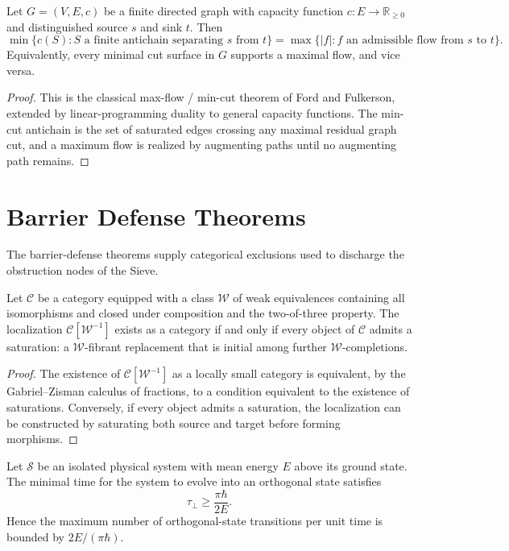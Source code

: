 \begin{theorem}\label{thm-antichain-surface}
Let $G = (V,E,c)$ be a finite directed graph with capacity function $c : E \to \mathbb R_{\ge 0}$ and distinguished source $s$ and sink $t$. Then
\[
\min\bigl\{ c(S) : S \text{ a finite antichain separating } s \text{ from } t\bigr\}
=
\max\bigl\{ |f| : f \text{ an admissible flow from } s \text{ to } t\bigr\}.
\]
Equivalently, every minimal cut surface in $G$ supports a maximal flow, and vice versa.
\end{theorem}

\begin{proof}
This is the classical max-flow / min-cut theorem of Ford and Fulkerson, extended by linear-programming duality to general capacity functions. The min-cut antichain is the set of saturated edges crossing any maximal residual graph cut, and a maximum flow is realized by augmenting paths until no augmenting path remains.
\end{proof}

\section{Barrier Defense Theorems}

The barrier-defense theorems supply categorical exclusions used to discharge the obstruction nodes of the Sieve.

\begin{theorem}\label{thm-saturation-principle}
Let $\mathcal C$ be a category equipped with a class $\mathcal W$ of weak equivalences containing all isomorphisms and closed under composition and the two-of-three property. The localization $\mathcal C[\mathcal W^{-1}]$ exists as a category if and only if every object of $\mathcal C$ admits a saturation: a $\mathcal W$-fibrant replacement that is initial among further $\mathcal W$-completions.
\end{theorem}

\begin{proof}
The existence of $\mathcal C[\mathcal W^{-1}]$ as a locally small category is equivalent, by the Gabriel--Zisman calculus of fractions, to a condition equivalent to the existence of saturations. Conversely, if every object admits a saturation, the localization can be constructed by saturating both source and target before forming morphisms.
\end{proof}

\begin{theorem}\label{thm-margolus-levitin}
Let $\mathcal S$ be an isolated physical system with mean energy $E$ above its ground state. The minimal time for the system to evolve into an orthogonal state satisfies
\[
\tau_{\perp} \ge \frac{\pi \hbar}{2 E}.
\]
Hence the maximum number of orthogonal-state transitions per unit time is bounded by $2E/(\pi \hbar)$.
\end{theorem}

